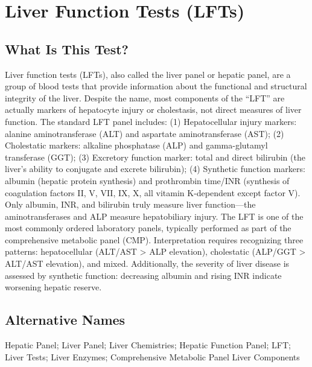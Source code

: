 \chapter{Liver Function Tests (LFTs)}

\section*{What Is This Test?}
Liver function tests (LFTs), also called the liver panel or hepatic panel, are a group of blood tests that provide information about the functional and structural integrity of the liver. Despite the name, most components of the ``LFT'' are actually markers of hepatocyte injury or cholestasis, not direct measures of liver function. The standard LFT panel includes: (1) Hepatocellular injury markers: alanine aminotransferase (ALT) and aspartate aminotransferase (AST); (2) Cholestatic markers: alkaline phosphatase (ALP) and gamma-glutamyl transferase (GGT); (3) Excretory function marker: total and direct bilirubin (the liver's ability to conjugate and excrete bilirubin); (4) Synthetic function markers: albumin (hepatic protein synthesis) and prothrombin time/INR (synthesis of coagulation factors II, V, VII, IX, X, all vitamin K-dependent except factor V). Only albumin, INR, and bilirubin truly measure liver function---the aminotransferases and ALP measure hepatobiliary injury. The LFT is one of the most commonly ordered laboratory panels, typically performed as part of the comprehensive metabolic panel (CMP). Interpretation requires recognizing three patterns: hepatocellular (ALT/AST > ALP elevation), cholestatic (ALP/GGT > ALT/AST elevation), and mixed. Additionally, the severity of liver disease is assessed by synthetic function: decreasing albumin and rising INR indicate worsening hepatic reserve.

\section*{Alternative Names}
Hepatic Panel; Liver Panel; Liver Chemistries; Hepatic Function Panel; LFT; Liver Tests; Liver Enzymes; Comprehensive Metabolic Panel Liver Components

